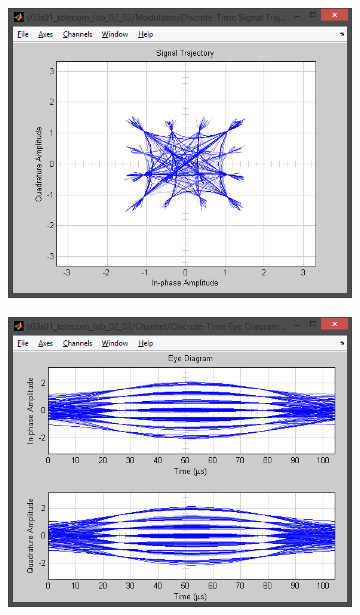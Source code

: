 \documentclass[
	a4paper,
	oneside,
	BCOR = 10mm,
	DIV = 12,
	12pt,
	headings = normal,
]{scrartcl}
\begin{document}
\begin{figure}[!htbp]
\begin{subfigure}{\textwidth / 3}
						\caption{}
						\label{subfig:phaseshift-signal-trajectory-in}
					\end{subfigure}%
					\begin{subfigure}{\textwidth / 3}
						\centering
						\includegraphics[height = 7\baselineskip]{../01-solution/00-SNR-100db-noshift-modulator-signal-trajectory.png}
						\caption{}
						\label{subfig:phaseshift-scatter-plot-in}
					\end{subfigure}
					\begin{subfigure}{\textwidth / 3}
						\centering
						\includegraphics[height = 7\baselineskip]{../01-solution/02-phaseshift-45-deg-channel-eye-diagram.png}

\end{subfigure}
\end{figure}
\end{document}
